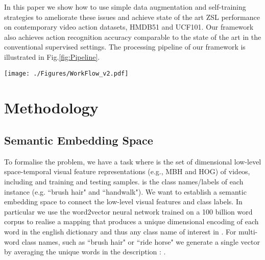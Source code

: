 \documentclass{article}
\begin{document}
In this paper we show how to use simple data augmentation and self-training strategies to ameliorate these issues and achieve state of the art ZSL performance on contemporary video action datasets, HMDB51 and UCF101. Our framework also achieves action recognition accuracy comparable to the state of the art in the conventional supervised settings. The processing pipeline of our framework is illustrated in Fig.\ref{fig:Pipeline}.


\begin{figure*}[!hbt]
\begin{center}
\texttt{[image: ./Figures/WorkFlow\_v2.pdf]}
\end{center}
\vspace{-0.4cm}
\caption{Illustration of our framework's processing pipeline. We start by exploiting word2vector  to project textual labels  into semantic embedding space . Then we learn a Support Vector Regression  to map low-level visual features  into the semantic space. By augmenting target training data  with auxiliary data  we can achieve the state-of-the-art performance for Zero-shot Learning and competitive performance on Multi-shot Learning}
\label{fig:Pipeline}
\vspace{-0.3cm}
\end{figure*}

 \vspace{-0.2cm}
\section{Methodology}
\subsection{Semantic Embedding Space}\label{subsec:semanticembedding}
To formalise the problem, we have a task  where  is the set of  dimensional low-level space-temporal visual feature representations (e.g., MBH and HOG) of  videos, including  and  training and testing samples.   is the class names/labels of each instance (e.g. ``brush hair" and ``handwalk"). We want to establish a semantic embedding space  to connect the low-level visual features and class labels. In particular we use the word2vector neural network  trained on a 100 billion word corpus to realise a mapping  that produces a  unique  dimensional  encoding of each word in the english dictionary and thus any class name of interest in . For multi-word class names, such as ``brush hair" or ``ride horse" we generate a single vector  by averaging the unique words  in the description \cite{milajevs2014sentenceComposition}: .
\end{document}
